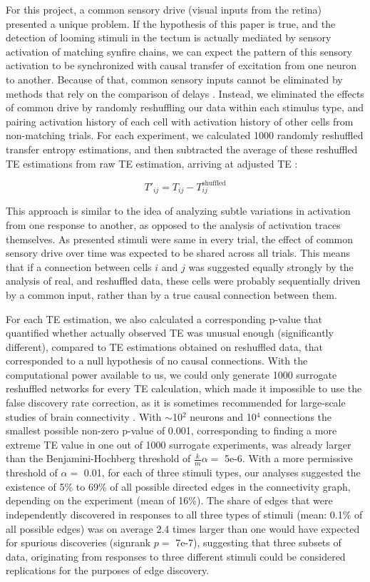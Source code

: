 \documentclass{article}
\begin{document}
For this project, a common sensory drive (visual inputs from the retina) presented a unique problem. If the hypothesis of this paper is true, and the detection of looming stimuli in the tectum is actually mediated by sensory activation of matching synfire chains, we can expect the pattern of this sensory activation to be synchronized with causal transfer of excitation from one neuron to another. Because of that, common sensory inputs cannot be eliminated by methods that rely on the comparison of delays \citep{wollstadt2014te}. Instead, we eliminated the effects of common drive by randomly reshuffling our data within each stimulus type, and pairing activation history of each cell with activation history of other cells from non-matching trials. For each experiment, we calculated 1000 randomly reshuffled transfer entropy estimations, and then subtracted the average of these reshuffled TE estimations from raw TE estimation, arriving at adjusted TE \citep{gourevitch2007te}:

\[ T'_{ij} = T_{ij} - T^\text{shuffled}_{ij} \]

This approach is similar to the idea of analyzing subtle variations in activation from one response to another, as opposed to the analysis of activation traces themselves. As presented stimuli were same in every trial, the effect of common sensory drive over time was expected to be shared across all trials. This means that if a connection between cells $i$ and $j$ was suggested equally strongly by the analysis of real, and reshuffled data, these cells were probably sequentially driven by a common input, rather than by a true causal connection between them.

For each TE estimation, we also calculated a corresponding p-value that quantified whether actually observed TE was unusual enough (significantly different), compared to TE estimations obtained on reshuffled data, that corresponded to a null hypothesis of no causal connections. With the computational power available to us, we could only generate 1000 surrogate reshuffled networks for every TE calculation, which made it impossible to use the false discovery rate correction, as it is sometimes recommended for large-scale studies of brain connectivity \citep{lindner2011trentool, vicente2011te}. With $\sim$10$^2$ neurons and 10$^4$ connections the smallest possible non-zero p-value of 0.001, corresponding to finding a more extreme TE value in one out of 1000 surrogate experiments, was already larger than the Benjamini-Hochberg threshold of $\frac{k}{m}\alpha=$ 5e-6. With a more permissive threshold of $\alpha=$ 0.01, for each of three stimuli types, our analyses suggested the existence of 5\% to 69\% of all possible directed edges in the connectivity graph, depending on the experiment (mean of 16\%). The share of edges that were independently discovered in responses to all three types of stimuli  (mean: 0.1\% of all possible edges) was on average 2.4 times larger than one would have expected for spurious discoveries (signrank $p=$ 7e-7), suggesting that three subsets of data, originating from responses to three different stimuli could be considered replications for the purposes of edge discovery. 
\end{document}
